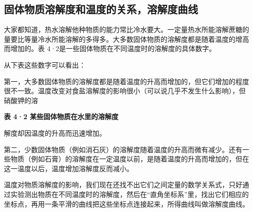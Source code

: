 \subsection{固体物质溶解度和温度的关系，溶解度曲线}

大家都知道，热水溶解他种物质的能力常比冷水要大。一定量热水所能溶解蔗糖的量要比等量冷水所能溶解的多得多。大多数固体物质的溶解度都是随着温度的增高而增加的。表
4·2是一些固体物质在不同温度时的溶解度的具体数字。

从下表这些数字可以看出：

第一，大多数固体物质的溶解度都是随着温度的升高而增加的，但它们增加的程度很不一致。温度改变对食盐溶解度的影响很小（可以说几乎不发生什么影响），但硝酸钾的溶

\textbf{表 4·2 某些固体物质在水里的溶解度}

{\centering
\small\setlength{\tabcolsep}{3pt}%
\par
}

解度却因温度的升高而迅速增加。

第二，少数固体物质（例如消石灰）的溶解度随着温度的升高而微有减少。还有一些物质（例如石膏）的溶解度在一定温度以前，是随着温度的升高而增加的，但在这一温度以后，温度增加溶解度反而减小。

温度对物质溶解度的影响，我们现在还找不出它们之间定量的数学关系式，只好通过实验测出物质在不同温度时的溶解度，然后在``直角坐标系''里，找出它们相应的坐标点，再用一条平滑的曲线把这些坐标点连接起来，所得曲线叫做溶解度曲线。

